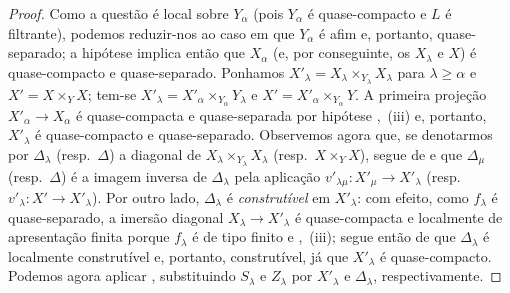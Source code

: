 \begin{proof}
Como a questão é local sobre $Y_\alpha$ (pois $Y_\alpha$ é quase-compacto e $L$ é filtrante), podemos reduzir-nos ao caso em que $Y_\alpha$ é afim e, portanto, quase-separado; a hipótese implica então que $X_\alpha$ (e, por conseguinte, os $X_\lambda$ e $X$) é quase-compacto e quase-separado.
Ponhamos $X'_\lambda=X_\lambda\times_{Y_\lambda}X_\lambda$ para $\lambda\geqslant\alpha$ e $X'=X\times_Y X$; tem-se $X'_\lambda=X'_\alpha\times_{Y_\alpha}Y_\lambda$ e $X'=X'_\alpha\times_{Y_\alpha}Y$. A primeira projeção $X'_\alpha\to X_\alpha$ é quase-compacta e quase-separada por hipótese ,~(iii) e, portanto, $X'_\lambda$ é quase-compacto e quase-separado.
Observemos agora que, se denotarmos por $\Delta_\lambda$ (resp.\ $\Delta$) a diagonal de $X_\lambda\times_{Y_\lambda}X_\lambda$ (resp.\ $X\times_Y X$), segue de  e  que $\Delta_\mu$ (resp.\ $\Delta$) é a imagem inversa de $\Delta_\lambda$ pela aplicação $v'_{\lambda\mu}:X'_\mu\to X'_\lambda$ (resp.\ $v'_\lambda:X'\to X'_\lambda$).
Por outro lado, $\Delta_\lambda$ é \emph{construtível} em $X'_\lambda$: com efeito, como $f_\lambda$ é quase-separado, a imersão diagonal $X_\lambda\to X'_\lambda$ é quase-compacta e localmente de apresentação finita porque $f_\lambda$ é de tipo finito  e ,~(iii); segue então de  que $\Delta_\lambda$ é localmente construtível e, portanto, construtível, já que $X'_\lambda$ é quase-compacto.
Podemos agora aplicar , substituindo $S_\lambda$ e $Z_\lambda$ por $X'_\lambda$ e $\Delta_\lambda$, respectivamente.
\end{proof}

